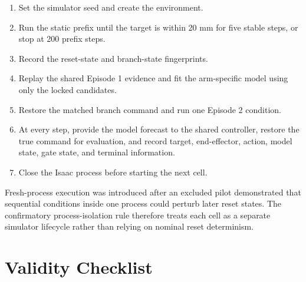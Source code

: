 \documentclass[10pt]{article}
\begin{document}
\begin{enumerate}[leftmargin=*]

\item Set the simulator seed and create the environment.

\item Run the static prefix until the target is within 20 mm for five stable steps, or stop at 200 prefix steps.

\item Record the reset-state and branch-state fingerprints.

\item Replay the shared Episode 1 evidence and fit the arm-specific model using only the locked candidates.

\item Restore the matched branch command and run one Episode 2 condition.

\item At every step, provide the model forecast to the shared controller, restore the true command for evaluation, and record target, end-effector, action, model state, gate state, and terminal information.

\item Close the Isaac process before starting the next cell.

\end{enumerate}

Fresh-process execution was introduced after an excluded pilot demonstrated that sequential conditions inside one process could perturb later reset states. The confirmatory process-isolation rule therefore treats each cell as a separate simulator lifecycle rather than relying on nominal reset determinism.

\section{Validity Checklist}
\end{document}
